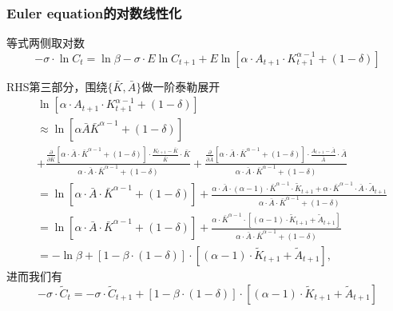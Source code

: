 \subsubsection{Euler equation的对数线性化}
等式两侧取对数
\begin{equation*}
  -\sigma \cdot \ln C_t = \ln \beta - \sigma \cdot E \ln C_{t+1} + E  \ln \left[\alpha \cdot A_{t+1} \cdot K_{t+1}^{\alpha - 1} + \left(1 - \delta \right)\right]
\end{equation*}

RHS第三部分，围绕$\{\bar{K}, \bar{A}\}$做一阶泰勒展开
\begin{equation*}
\begin{split}
  &\ln \left[\alpha \cdot A_{t+1} \cdot K_{t+1}^{\alpha - 1} + \left(1 - \delta \right)\right] \\
  & \approx \ln \left[\alpha \bar{A} \bar{K}^{\alpha - 1} + (1-\delta) \right]\\
  &+ \frac{
  \frac{\partial}{\partial \bar{K}} \left[\alpha \cdot \bar{A} \cdot \bar{K}^{\alpha - 1} + (1-\delta) \right] \cdot \frac{K_{t+1} - \bar{K}}{\bar{K}} \cdot \bar{K}
  }
  {
  \alpha \cdot \bar{A} \cdot \bar{K}^{\alpha - 1} + (1-\delta)
  }
  + \frac{
  \frac{\partial}{\partial \bar{A}} \left[\alpha \cdot \bar{A} \cdot \bar{K}^{\alpha - 1} + (1-\delta) \right] \cdot \frac{A_{t+1} - \bar{A}}{\bar{A}} \cdot \bar{A}
  }
  {
  \alpha \cdot \bar{A} \cdot \bar{K}^{\alpha - 1} + (1-\delta)
  } \\
  &= \ln \left[\alpha \cdot \bar{A} \cdot \bar{K}^{\alpha - 1} + (1-\delta) \right] + \frac{
  \alpha \cdot \bar{A} \cdot (\alpha - 1) \cdot \bar{K}^{\alpha - 1} \cdot \tilde{K}_{t+1}
  + \alpha \cdot \bar{K}^{\alpha - 1} \cdot \bar{A} \cdot \tilde{A}_{t+1}
  }{
  \alpha \cdot \bar{A} \cdot \bar{K}^{\alpha - 1} + (1-\delta)
  } \\
  &= \ln \left[ \alpha \cdot \bar{A} \cdot \bar{K}^{\alpha - 1} + (1-\delta) \right]+ \frac{
  \alpha \cdot \bar{K}^{\alpha -1} \cdot \left[ (\alpha - 1) \cdot \tilde{K}_{t+1} + \tilde{A}_{t+1}\right]
  }{\alpha \cdot \bar{A} \cdot \bar{K}^{\alpha - 1} + (1-\delta)} \\
  &= -\ln \beta + \left[1 - \beta \cdot (1-\delta)\right] \cdot \left[ (\alpha - 1) \cdot \tilde{K}_{t+1} + \tilde{A}_{t+1} \right],
\end{split}
\end{equation*}
进而我们有
\begin{equation}
  \label{eq:simple-steady-state-euler}
  -\sigma \cdot \tilde{C}_{t} = -\sigma \cdot \tilde{C}_{t+1} + \left[1 - \beta \cdot (1-\delta) \right] \cdot \left[ (\alpha - 1) \cdot \tilde{K}_{t+1} + \tilde{A}_{t+1}\right]
\end{equation}

